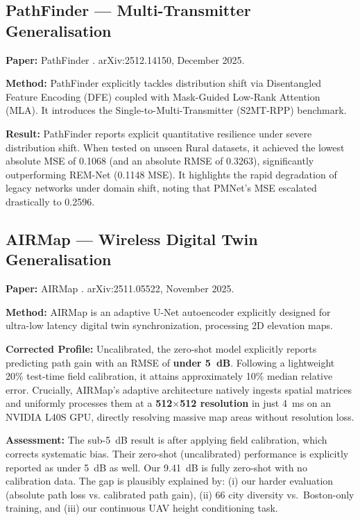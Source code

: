 \documentclass[11pt,a4paper]{article}
\begin{document}
\subsection{PathFinder --- Multi-Transmitter Generalisation}

\textbf{Paper:} PathFinder \cite{pathfinder2025}. arXiv:2512.14150, December 2025.

\textbf{Method:} PathFinder explicitly tackles distribution shift via Disentangled Feature Encoding (DFE) coupled with Mask-Guided Low-Rank Attention (MLA). It introduces the Single-to-Multi-Transmitter (S2MT-RPP) benchmark.

\textbf{Result:} PathFinder reports explicit quantitative resilience under severe distribution shift. When tested on unseen Rural datasets, it achieved the lowest absolute MSE of 0.1068 (and an absolute RMSE of 0.3263), significantly outperforming REM-Net (0.1148 MSE). It highlights the rapid degradation of legacy networks under domain shift, noting that PMNet's MSE escalated drastically to 0.2596.

\subsection{AIRMap --- Wireless Digital Twin Generalisation}

\textbf{Paper:} AIRMap \cite{airmap2025}. arXiv:2511.05522, November 2025.

\textbf{Method:} AIRMap is an adaptive U-Net autoencoder explicitly designed for ultra-low latency digital twin synchronization, processing 2D elevation maps.

\textbf{Corrected Profile:} Uncalibrated, the zero-shot model explicitly reports predicting path gain with an RMSE of \textbf{under 5~dB}. Following a lightweight 20\% test-time field calibration, it attains approximately 10\% median relative error. Crucially, AIRMap's adaptive architecture natively ingests spatial matrices and uniformly processes them at a \textbf{512$\times$512 resolution} in just 4~ms on an NVIDIA L40S GPU, directly resolving massive map areas without resolution loss.

\textbf{Assessment:} The sub-5~dB result is after applying field calibration,
which corrects systematic bias. Their zero-shot (uncalibrated) performance is explicitly reported as under 5~dB as well. Our 9.41~dB is fully zero-shot with no calibration data.
The gap is plausibly explained by: (i) our harder evaluation (absolute path loss vs.
calibrated path gain), (ii) 66 city diversity vs.\ Boston-only training, and
(iii) our continuous UAV height conditioning task.
\end{document}
